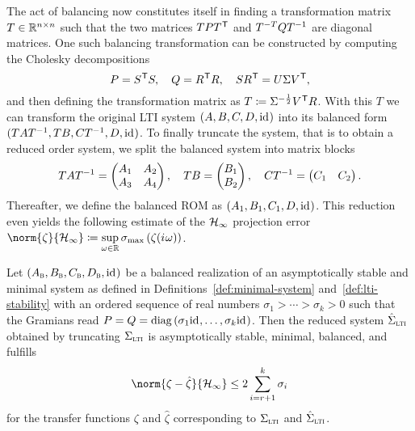 
The act of balancing now constitutes itself in finding a transformation matrix $T \in \bb{R}^{n \times n}$ such that the two matrices $T P T\trans$ and $T\inv[T] Q T\inv$ are diagonal matrices.
One such balancing transformation can be constructed by computing the Cholesky decompositions
\begin{equation}\label{eq:balancing}
    P = S\trans S,\quad Q = R\trans R,\quad S R\trans = U \Sigma V\trans,
\end{equation}
and then defining the transformation matrix as $T \coloneqq \Sigma\inv[\frac{1}{2}] V\trans R$.
With this $T$ we can transform the original \ac{LTI} system $(A, B, C, D, \id)$ into its balanced form $(T A T\inv, T B, C T\inv, D, \id)$.
To finally truncate the system, that is to obtain a reduced order system, we split the balanced system into matrix blocks
\begin{equation*}
    T A T\inv = \begin{pmatrix}
        A_1 & A_2 \\
        A_3 & A_4
    \end{pmatrix},\quad T B = \begin{pmatrix}
        B_1 \\
        B_2
    \end{pmatrix},\quad C T\inv = \begin{pmatrix}
        C_1 & C_2
    \end{pmatrix}.
\end{equation*}
Thereafter, we define the balanced \ac{ROM} as $(A_1, B_1, C_1, D, \id)$.
This reduction even yields the following estimate of the $\mcl{H}_\infty$ projection error $\norm{\zeta}{\mcl{H}_\infty} \coloneqq \sup\limits_{\omega \in \bb{R}} \sigma_{\max} \left( \zeta(\iu \omega) \right)$.

\begin{theorem}\label{thm:h-inf-error}
    Let $(A_\msc{b}, B_\msc{b}, C_\msc{b}, D_\msc{b}, \id)$ be a balanced realization of an asymptotically stable and minimal system as defined in Definitions~\ref{def:minimal-system} and~\ref{def:lti-stability} with an ordered sequence of real numbers $\sigma_1 > \cdots > \sigma_k > 0$ such that the Gramians read $P = Q = \diag{\sigma_1 \id, \dots, \sigma_k \id}$.
    Then the reduced system $\hat{\Sigma}_\msc{lti}$ obtained by truncating $\Sigma_\msc{lti}$ is asymptotically stable, minimal, balanced, and fulfills
    \begin{equation*}
        \norm{\zeta - \hat{\zeta}}{\mcl{H}_\infty} \leq 2 \sum\limits_{i = r + 1}^k \sigma_i
    \end{equation*}
    for the transfer functions $\zeta$ and $\hat{\zeta}$ corresponding to $\Sigma_\msc{lti}$ and $\hat{\Sigma}_\msc{lti}$.
\end{theorem}

